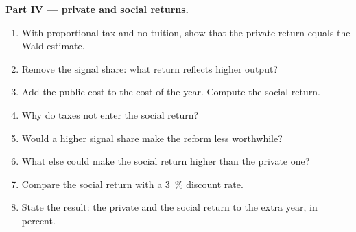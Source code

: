 \begin{problem}
\medskip\noindent\textbf{Part IV --- private and social returns.}
\begin{enumerate}[resume]
\item With proportional tax and no tuition, show that the private return equals the
Wald estimate.
\item Remove the signal share: what return reflects higher output?
\item Add the public cost to the cost of the year. Compute the social return.
\item Why do taxes not enter the social return?
\item Would a higher signal share make the reform less worthwhile?
\item What else could make the social return higher than the private one?
\item Compare the social return with a 3~\% discount rate.
\item State the result: the private and the social return to the extra year, in percent.
\end{enumerate}
\end{problem}
